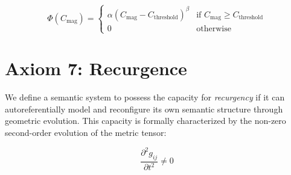 \begin{equation}
\Phi(C_{\text{mag}}) = \begin{cases}
\alpha (C_{\text{mag}} - C_{\text{threshold}})^{\beta} & \text{if } C_{\text{mag}} \geq C_{\text{threshold}} \\
0 & \text{otherwise}
\end{cases}
\end{equation}


\section{Axiom 7: Recurgence}
\label{1.7:axiom_7_recurgence}

We define a semantic system to possess the capacity for \textit{recurgency} if it can autoreferentially model and reconfigure its own semantic structure through geometric evolution. This capacity is formally characterized by the non-zero second-order evolution of the metric tensor:

\begin{equation}
\frac{\partial^2 g_{ij}}{\partial t^2} \neq 0
\end{equation} 